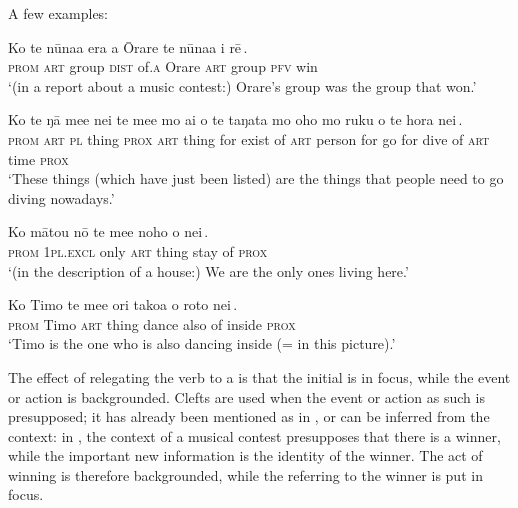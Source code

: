 A few examples:

\ea\label{ex:9.40}
\gll Ko te nūna{\ꞌ}a era {\ꞌ}a {\ꞌ}Ōrare {\ob}te nūna{\ꞌ}a i rē\,{\cb}. \\
\textsc{prom} \textsc{art} group \textsc{dist} of\textsc{.a} Orare {\db}\textsc{art} group \textsc{pfv} win \\

\glt 
‘(in a report about a music contest:) Orare’s group was the group that won.’ \textstyleExampleref{[R539-3.313]}
\z

\ea\label{ex:9.41}
\gll Ko te ŋā me{\ꞌ}e nei {\ob}te me{\ꞌ}e mo ai o te taŋata  mo oho mo ruku o te hora nei\,{\cb}.\\
\textsc{prom} \textsc{art} \textsc{pl} thing \textsc{prox} {\db}\textsc{art} thing for exist of \textsc{art} person  for go for dive of \textsc{art} time \textsc{prox}\\

\glt 
‘These things (which have just been listed) are the things that people need to go diving nowadays.’ \textstyleExampleref{[R360.002]} 
\z

\ea\label{ex:9.42}
\gll Ko mātou nō {\ob}te me{\ꞌ}e noho o nei\,{\cb}. \\
\textsc{prom} \textsc{1pl.excl} only {\db}\textsc{art} thing stay of \textsc{prox} \\

\glt 
‘(in the description of a house:) We are the only ones living here.’ \textstyleExampleref{[R404.050]} 
\z

\ea\label{ex:9.43}
\gll Ko Timo {\ob}te me{\ꞌ}e {\ꞌ}ori tako{\ꞌ}a o roto nei\,{\cb}. \\
\textsc{prom} Timo {\db}\textsc{art} thing dance also of inside \textsc{prox} \\

\glt
‘Timo is the one who is also dancing inside (= in this picture).’ \textstyleExampleref{[R414.129]} 
\z

The effect of relegating the verb to a  is that the initial  is in focus, while the event or action is backgrounded. Clefts are used when the event or action as such is presupposed; it has already been mentioned as in , or can be inferred from the context: in , the context of a musical contest presupposes that there is a winner, while the important new information is the identity of the winner. The act of winning is therefore backgrounded, while the  referring to the winner is put in focus.


